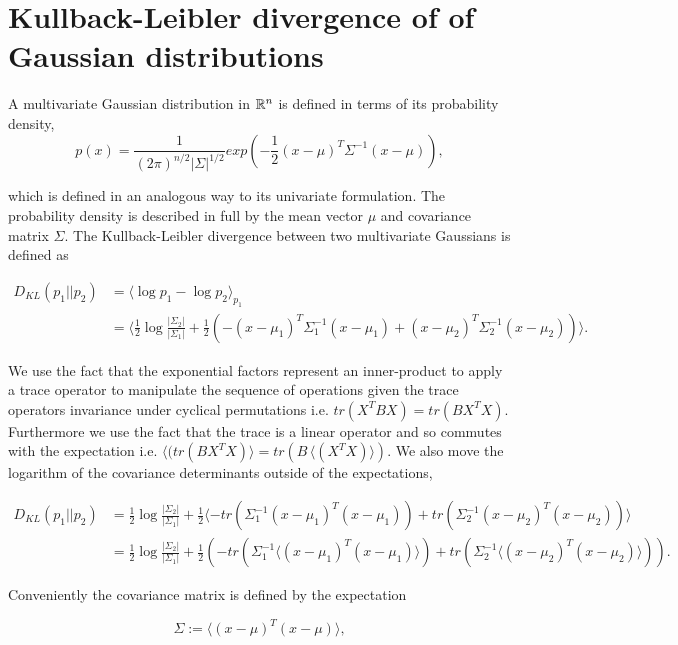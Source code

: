 \chapter{Kullback-Leibler divergence of of Gaussian distributions}\label{appendix:kl_gauss}

A multivariate Gaussian distribution in $\mathbb{R}^n$ is defined in terms of its probability density,  
\begin{equation}\label{eq:multi_gauss}
p(x) = \frac{1}{(2\pi)^{n/2}|\Sigma|^{1/2}}exp(-\frac{1}{2}(x- \mu)^T\Sigma^{-1}(x-\mu)),
\end{equation}

\noindent which is defined in an analogous way to its univariate formulation. The probability density is described in full by the mean vector $\mu$ and covariance matrix $\Sigma$.
The Kullback-Leibler divergence between two multivariate Gaussians is defined as 

\begin{align*}
D_{KL}(p_1|| p_2 ) &= \langle \log p_1 - \log p_2 \rangle_{p_1} \\
&= \langle \frac{1}{2}\log \frac{|\Sigma_2|}{|\Sigma_1|} + \frac{1}{2} (-(x- \mu_1)^T\Sigma_1^{-1}(x-\mu_1) + (x- \mu_2)^T\Sigma_2^{-1}(x-\mu_2))   \rangle.
\end{align*}

\noindent We use the fact that the exponential factors represent an inner-product to apply a trace operator to manipulate the sequence of operations given the trace operators invariance under cyclical permutations i.e. $tr(X^TBX) = tr(BX^TX)$. Furthermore we use the fact that the trace is a linear operator and so commutes with the expectation i.e. $\langle(tr(BX^TX)\rangle = tr(B\, \langle(X^TX)\rangle)$. We also move the logarithm of the covariance determinants outside of the expectations, 

\begin{align*}
D_{KL}(p_1|| p_2 ) &= \frac{1}{2}\log \frac{|\Sigma_2|}{|\Sigma_1|} + \frac{1}{2} \langle - tr(\Sigma^{-1}_1(x-\mu_1)^T(x-\mu_1)) + tr(\Sigma^{-1}_2(x-\mu_2)^T(x-\mu_2))\rangle \\
&= \frac{1}{2}\log \frac{|\Sigma_2|}{|\Sigma_1|} + \frac{1}{2} (- tr(\Sigma^{-1}_1\langle(x-\mu_1)^T(x-\mu_1)\rangle) + tr(\Sigma^{-1}_2\langle(x-\mu_2)^T(x-\mu_2)\rangle)).
\end{align*}

\noindent Conveniently the covariance matrix is defined by the expectation 

\begin{equation}
\Sigma := \langle (x-\mu)^T(x-\mu)\rangle, 
\end{equation}

